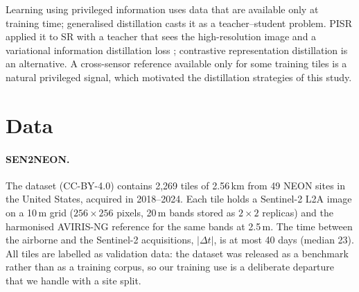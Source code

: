 \documentclass[pdflatex,sn-basic,referee,lineno]{sn-jnl}
\begin{document}
Learning using privileged information \citep{vapnik2009lupi} uses data that are available only at training time;
generalised distillation \citep{lopezpaz2015unifying} casts it as a teacher--student problem. PISR \citep{lee2020pisr}
applied it to SR with a teacher that sees the high-resolution image and a variational information distillation
loss \citep{ahn2019vid}; contrastive representation distillation \citep{tian2019crd} is an alternative. A cross-sensor
reference available only for some training tiles is a natural privileged signal, which motivated the distillation
strategies of this study.

\section{Data}\label{sec:data}

\paragraph{SEN2NEON.} The dataset \citep{donike2026sen2neon} (CC-BY-4.0) contains 2,269 tiles of 2.56\,km from 49
NEON sites in the United States, acquired in 2018--2024. Each tile holds a Sentinel-2 L2A image on a 10\,m grid
($256\times256$ pixels, 20\,m bands stored as $2\times2$ replicas) and the harmonised AVIRIS-NG reference for the
same bands at 2.5\,m. The time between the airborne and the Sentinel-2 acquisitions, $|\Delta t|$, is at most 40
days (median 23). All tiles are labelled as validation data: the dataset was released as a benchmark rather than as
a training corpus, so our training use is a deliberate departure that we handle with a site split.
\end{document}
